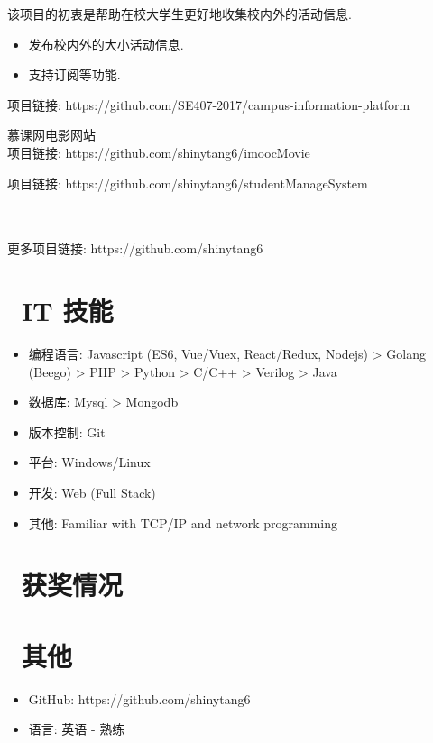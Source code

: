 \documentclass{resume}
\begin{document}
该项目的初衷是帮助在校大学生更好地收集校内外的活动信息.
\begin{itemize}
  \item 发布校内外的大小活动信息.
  \item 支持订阅等功能.
\end{itemize}
项目链接: https://github.com/SE407-2017/campus-information-platform


慕课网电影网站\\
项目链接: https://github.com/shinytang6/imoocMovie

项目链接: https://github.com/shinytang6/studentManageSystem

\\
\\
更多项目链接: https://github.com/shinytang6



\section{\faCogs\ IT 技能}
\begin{itemize}[parsep=0.5ex]
  \item 编程语言: Javascript (ES6, Vue/Vuex, React/Redux, Nodejs) > Golang (Beego) > PHP > Python > C/C++ > Verilog > Java
  \item 数据库: Mysql > Mongodb
  \item 版本控制: Git
  \item 平台: Windows/Linux
  \item 开发: Web (Full Stack)
  \item 其他: Familiar with TCP/IP and network programming
\end{itemize}

\section{\faHeartO\ 获奖情况}


\section{\faInfo\ 其他}
\begin{itemize}[parsep=0.5ex]
  \item GitHub: https://github.com/shinytang6
  \item 语言: 英语 - 熟练
\end{itemize}

%
%
\end{document}
